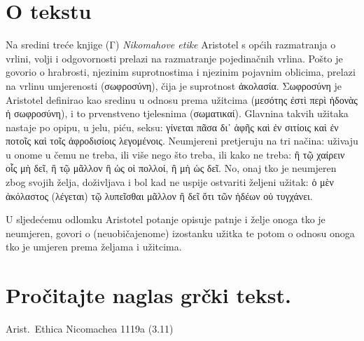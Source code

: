 
\section*{O tekstu}

Na sredini treće knjige (Γ) \textit{Nikomahove etike} Aristotel s općih razmatranja o vrlini, volji i odgovornosti prelazi na razmatranje pojedinačnih vrlina. Pošto je govorio o hrabrosti, njezinim suprotnostima i njezinim pojavnim oblicima, prelazi na vrlinu umjerenosti \textgreek[variant=ancient]{(σωφροσύνη),} čija je suprotnost \textgreek[variant=ancient]{ἀκολασία.  Σωφροσύνη} je Aristotel definirao kao sredinu u odnosu prema užitcima \textgreek[variant=ancient]{(μεσότης ἐστὶ περὶ ἡδονὰς ἡ σωφροσύνη),} i to prvenstveno tjelesnima \textgreek[variant=ancient]{(σωματικαί).} Glavnina takvih užitaka nastaje po opipu, u jelu, piću, seksu: \textgreek[variant=ancient]{γίνεται πᾶσα δι᾽ ἁφῆς καὶ ἐν σιτίοις καὶ ἐν ποτοῖς καὶ τοῖς ἀφροδισίοις λεγομένοις.} Neumjereni pretjeruju na tri načina: uživaju u onome u čemu ne treba, ili više nego što treba, ili kako ne treba: \textgreek[variant=ancient]{ἢ τῷ χαίρειν οἷς μὴ δεῖ, ἢ τῷ μᾶλλον ἢ ὡς οἱ πολλοί, ἢ μὴ ὡς δεῖ.} No, onaj tko je neumjeren zbog svojih želja, doživljava i bol kad ne uspije ostvariti željeni užitak: \textgreek[variant=ancient]{ὁ μὲν ἀκόλαστος (λέγεται) τῷ λυπεῖσθαι μᾶλλον ἢ δεῖ ὅτι τῶν ἡδέων οὐ τυγχάνει.}

U sljedećemu odlomku Aristotel potanje opisuje patnje i želje onoga tko je neumjeren, govori o (neuobičajenome) izostanku užitka te potom o odnosu onoga tko je umjeren prema željama i užitcima.


\section*{Pročitajte naglas grčki tekst.}

Arist.\ Ethica Nicomachea 1119a (3.11)


\medskip


